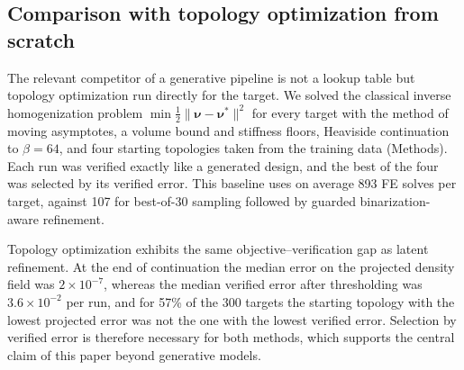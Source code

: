 \subsection{Comparison with topology optimization from scratch}

The relevant competitor of a generative pipeline is not a lookup table but
topology optimization run directly for the target. We solved the classical
inverse homogenization problem $\min\tfrac12\lVert\boldsymbol\nu-\boldsymbol\nu^{*}\rVert^2$
for every target with the method of moving asymptotes, a volume bound and
stiffness floors, Heaviside continuation to $\beta=64$, and four starting
topologies taken from the training data (Methods). Each run was verified
exactly like a generated design, and the best of the four was selected by
its verified error. This baseline uses on average 893 FE solves per target,
against 107 for best-of-30 sampling followed by guarded binarization-aware
refinement.

Topology optimization exhibits the same objective--verification gap as
latent refinement. At the end of continuation the median error on the
projected density field was $2\times10^{-7}$, whereas the median verified
error after thresholding was $3.6\times10^{-2}$ per run, and for 57\% of the
300 targets the starting topology with the lowest projected error was not
the one with the lowest verified error. Selection by verified error is therefore
necessary for both methods, which supports the central claim of this paper
beyond generative models.

